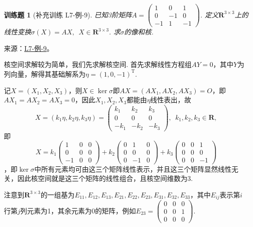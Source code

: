 \documentclass[12pt,fontset=fandol]{ctexart}
\newtheorem{exercise}{训练题}[section]
\begin{document}
\begin{exercise}[补充训练 L7-例-9]\label{prob:L7-例-9}
已知3阶矩阵$A=\begin{pmatrix}
            1 & 0 & 1 \\ 0 & -1 & 0 \\ -1 & 1 & -1
        \end{pmatrix}$. 定义$\mathbf{R}^{3 \times 3}$上的线性变换$\sigma(X)=AX,\enspace X \in \mathbf{R}^{3 \times 3}$. 求$\sigma$的像和核.
\end{exercise}
\noindent 来源：\href{https://github.com/yhwu-is/Linear-Algebra-Left-Undone/blob/new/%E8%AE%B2%E4%B9%89/%E4%B8%93%E9%A2%98/7%20%E7%BA%BF%E6%80%A7%E6%98%A0%E5%B0%84%E7%9F%A9%E9%98%B5%E8%A1%A8%E7%A4%BA%E4%B8%8E%E7%9F%A9%E9%98%B5%E8%BF%90%E7%AE%97%E5%9F%BA%E7%A1%80.tex}{L7-例-9}。
\begin{solve}
核空间求解较为简单，我们先求解核空间. 首先求解线性方程组$AY=0$，其中$Y$为列向量，解得其基础解系为$\eta=(1,0,-1)^\mathrm{T}$.

    记$X=(X_1,X_2,X_3)$，则$X\in\ker\sigma$即$AX=(AX_1,AX_2,AX_3)=O$，即$AX_1=AX_2=AX_3=0$，因此$X_1,X_2,X_3$都能由$\eta$线性表出，故
    \[X=(k_1\eta,k_2\eta,k_3\eta)=\begin{pmatrix}
            k_1 & k_2 & k_3 \\ 0 & 0 & 0 \\ -k_1 & -k_2 & -k_3
        \end{pmatrix},\enspace k_1,k_2,k_3\in\mathbf{R},\]
    即
\[X=k_1\begin{pmatrix}
            1 & 0 & 0 \\ 0 & 0 & 0 \\ -1 & 0 & 0
        \end{pmatrix}+k_2\begin{pmatrix}
            0 & 1 & 0 \\ 0 & 0 & 0 \\ 0 & -1 & 0
        \end{pmatrix}+k_3\begin{pmatrix}
            0 & 0 & 1 \\ 0 & 0 & 0 \\ 0 & 0 & -1
        \end{pmatrix}\]
，即$\ker\sigma$中所有元素均可由这三个矩阵线性表示，并且这三个矩阵显然线性无关，因此核空间就是这三个矩阵的线性组合，且核空间维数为3.

    注意到$\mathbf{R}^{3 \times 3}$的一组基为$E_{11},E_{12},E_{13},E_{21},E_{22},E_{23},E_{31},E_{32},E_{33}$，其中$E_{ij}$表示第$i$行第$j$列元素为1，其余元素为0的矩阵，例如$E_{23}=\begin{pmatrix}
            0 & 0 & 0 \\ 0 & 0 & 1 \\ 0 & 0 & 0
        \end{pmatrix}$.


\end{solve}
\end{document}
